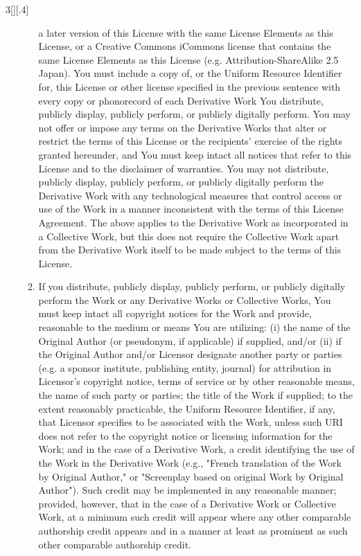 \documentclass[8pt,a4paper]{article}
\begin{document}
\begin{multicols}{3}[][.4\paperwidth]
\begin{enumerate}
\begin{enumerate}
        a later version of this License with the same License Elements as this
        License, or a Creative Commons iCommons license that contains the same
        License Elements as this License (e.g. Attribution-ShareAlike 2.5 Japan).
        You must include a copy of, or the Uniform Resource Identifier for, this
        License or other license specified in the previous sentence with every
        copy or phonorecord of each Derivative Work You distribute, publicly
        display, publicly perform, or publicly digitally perform. You may not
        offer or impose any terms on the Derivative Works that alter or restrict
        the terms of this License or the recipients' exercise of the rights
        granted hereunder, and You must keep intact all notices that refer to
        this License and to the disclaimer of warranties. You may not distribute,
        publicly display, publicly perform, or publicly digitally perform the
        Derivative Work with any technological measures that control access or
        use of the Work in a manner inconsistent with the terms of this License
        Agreement. The above applies to the Derivative Work as incorporated in a
        Collective Work, but this does not require the Collective Work apart from
        the Derivative Work itself to be made subject to the terms of this
        License.
  \item If you distribute, publicly display, publicly perform, or publicly
        digitally perform the Work or any Derivative Works or Collective Works,
        You must keep intact all copyright notices for the Work and provide,
        reasonable to the medium or means You are utilizing: (i) the name of the
        Original Author (or pseudonym, if applicable) if supplied, and/or (ii) if
        the Original Author and/or Licensor designate another party or parties
        (e.g. a sponsor institute, publishing entity, journal) for attribution in
        Licensor's copyright notice, terms of service or by other reasonable
        means, the name of such party or parties; the title of the Work if
        supplied; to the extent reasonably practicable, the Uniform Resource
        Identifier, if any, that Licensor specifies to be associated with the
        Work, unless such URI does not refer to the copyright notice or licensing
        information for the Work; and in the case of a Derivative Work, a credit
        identifying the use of the Work in the Derivative Work (e.g., "French
        translation of the Work by Original Author," or "Screenplay based on
        original Work by Original Author"). Such credit may be implemented in any
        reasonable manner; provided, however, that in the case of a Derivative
        Work or Collective Work, at a minimum such credit will appear where any
        other comparable authorship credit appears and in a manner at least as
        prominent as such other comparable authorship credit.


\end{enumerate}
\end{enumerate}
\end{multicols}
\end{document}
